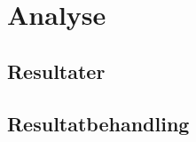 \chapter{Analyse}\label{ch:Analyse}

\section{Resultater}\label{sec:analyse-resultater}

\section{Resultatbehandling}\label{sec:analyse-resultatbehandling}